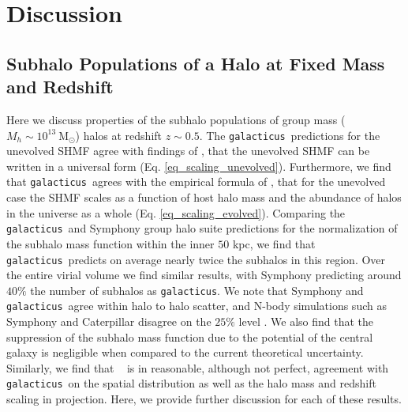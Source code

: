 \documentclass[%
 reprint,
 amsmath,
 amssymb,
 aps,
prd,
twocolumn,
superscriptaddress,
preprintnumbers,
floatfix,
nofootinbib
]{revtex4-2}
\def\gal{{\tt galacticus}~}
\def\galns{{\tt galacticus}}
\def\cat{Caterpillar }
\def\symphony{Symphony }
\def\hanetal{\citet{10.1093/mnras/stv2900}~}
\newcommand{\refeq}[1]{Eq. \ref{#1}}
\begin{document}

\section{Discussion}\label{sec_discussion}



\subsection{Subhalo Populations of a Halo at Fixed Mass and Redshift}\label{sec_discuss_pop}

Here we discuss properties of the subhalo populations of group mass ($M_h \sim 10^{13} ~\mathrm{M}_\odot$) halos at redshift $z \sim 0.5$.
The \gal predictions for the unevolved SHMF agree with findings of \citet{10.1111/j.1365-2966.2005.08964.x}, that the unevolved SHMF can be written in a universal form (\refeq{eq_scaling_unevolved}). 
Furthermore, we find that \gal agrees with the empirical formula of \citet{10.1111/j.1365-2966.2004.08360.x}, that for the unevolved case the SHMF scales as a function of host halo mass and the abundance of halos in the universe as a whole (\refeq{eq_scaling_evolved}). 
Comparing the \gal  and \symphony group halo suite predictions for the normalization of the subhalo mass function within the inner $50$ kpc, we find that \gal predicts on average nearly twice the subhalos in this region.
Over the entire virial volume we find similar results, with \symphony predicting around $40\%$ the number of subhalos as \galns.
We note that \symphony and \gal agree within halo to halo scatter, and N-body simulations such as \symphony and \cat disagree on the $25\%$ level \citep{nadler2023symphony}.
We also find that the suppression of the subhalo mass function due to the potential of the central galaxy is negligible when compared to the current theoretical uncertainty. 
Similarly, we find that \hanetal \citep{10.1093/mnras/stv2900} is in reasonable, although not perfect, agreement with \gal on the spatial distribution as well as the halo mass and redshift scaling in projection. 
Here, we provide further discussion for each of these results.
\end{document}
